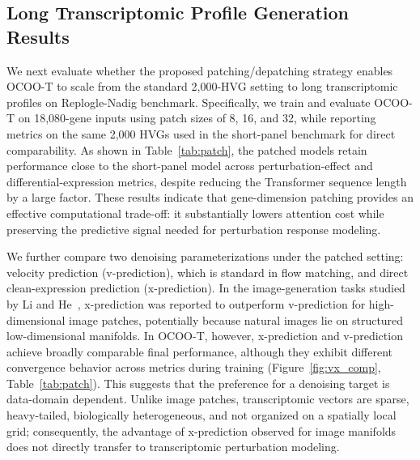 \documentclass[11pt]{article}
\begin{document}
\subsection{Long Transcriptomic Profile Generation Results}
We next evaluate whether the proposed patching/depatching strategy enables OCOO-T to scale from the standard 2,000-HVG setting to long transcriptomic profiles on Replogle-Nadig benchmark. Specifically, we train and evaluate OCOO-T on 18,080-gene inputs using patch sizes of 8, 16, and 32, while reporting metrics on the same 2,000 HVGs used in the short-panel benchmark for direct comparability. As shown in Table~\ref{tab:patch}, the patched models retain performance close to the short-panel model across perturbation-effect and differential-expression metrics, despite reducing the Transformer sequence length by a large factor. These results indicate that gene-dimension patching provides an effective computational trade-off: it substantially lowers attention cost while preserving the predictive signal needed for perturbation response modeling.

We further compare two denoising parameterizations under the patched setting: velocity prediction (v-prediction), which is standard in flow matching, and direct clean-expression prediction (x-prediction). In the image-generation tasks studied by Li and He~\cite{li2025back}, x-prediction was reported to outperform v-prediction for high-dimensional image patches, potentially because natural images lie on structured low-dimensional manifolds. In OCOO-T, however, x-prediction and v-prediction achieve broadly comparable final performance, although they exhibit different convergence behavior across metrics during training (Figure~\ref{fig:vx_comp}, Table~\ref{tab:patch}). This suggests that the preference for a denoising target is data-domain dependent. Unlike image patches, transcriptomic vectors are sparse, heavy-tailed, biologically heterogeneous, and not organized on a spatially local grid; consequently, the advantage of x-prediction observed for image manifolds does not directly transfer to transcriptomic perturbation modeling.
\end{document}
